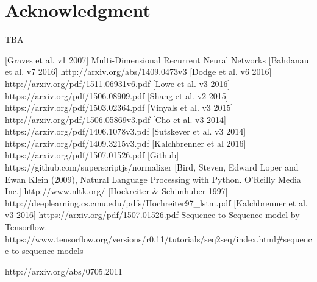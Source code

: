 \documentclass{article} %
\begin{document}
\section{Acknowledgment}
TBA
\begin{thebibliography}{1}
[Graves et al. v1 2007] Multi-Dimensional Recurrent Neural Networks
[Bahdanau et al. v7 2016] http://arxiv.org/abs/1409.0473v3
[Dodge et al. v6 2016] http://arxiv.org/pdf/1511.06931v6.pdf
[Lowe et al. v3 2016] https://arxiv.org/pdf/1506.08909.pdf
[Shang et al. v2 2015] https://arxiv.org/pdf/1503.02364.pdf
[Vinyals et al. v3 2015] http://arxiv.org/pdf/1506.05869v3.pdf
[Cho et al. v3 2014] https://arxiv.org/pdf/1406.1078v3.pdf
[Sutskever et al. v3 2014] https://arxiv.org/pdf/1409.3215v3.pdf
[Kalchbrenner et al 2016] https://arxiv.org/pdf/1507.01526.pdf
[Github] https://github.com/superscriptjs/normalizer
[Bird, Steven, Edward Loper and Ewan Klein (2009), Natural Language Processing with Python. O’Reilly Media Inc.] http://www.nltk.org/
[Hockreiter \& Schimhuber 1997] http://deeplearning.cs.cmu.edu/pdfs/Hochreiter97\_lstm.pdf
[Kalchbrenner et al. v3 2016] https://arxiv.org/pdf/1507.01526.pdf
Sequence to Sequence model by Tensorflow. https://www.tensorflow.org/versions/r0.11/tutorials/seq2seq/index.html\#sequence-to-sequence-models

\end{thebibliography} http://arxiv.org/abs/0705.2011
\end{document}
